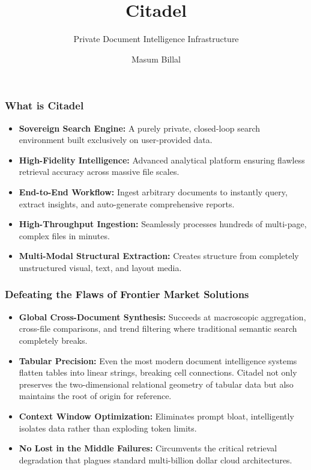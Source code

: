\documentclass{beamer}
\title{Citadel}
\subtitle{Private Document Intelligence Infrastructure}
\author{Masum Billal}
\begin{document}
	\frame{\titlepage}
	
	\begin{frame}
		\frametitle{What is Citadel}
		\begin{itemize}
			\item \textbf{Sovereign Search Engine:} A purely private, closed-loop search environment built exclusively on user-provided data.
			\item \textbf{High-Fidelity Intelligence:} Advanced analytical platform ensuring flawless retrieval accuracy across massive file scales.
			\item \textbf{End-to-End Workflow:} Ingest arbitrary documents to instantly query, extract insights, and auto-generate comprehensive reports.
			\item \textbf{High-Throughput Ingestion:} Seamlessly processes hundreds of multi-page, complex files in minutes.
			\item \textbf{Multi-Modal Structural Extraction:} Creates structure from completely unstructured visual, text, and layout media.
		\end{itemize}
	\end{frame}
	
	\begin{frame}
		\frametitle{Defeating the Flaws of Frontier Market Solutions}
		\begin{itemize}
			\item \textbf{Global Cross-Document Synthesis:} Succeeds at macroscopic aggregation, cross-file comparisons, and trend filtering where traditional semantic search completely breaks.
			\item \textbf{Tabular Precision:} Even the most modern document intelligence systems flatten tables into linear strings, breaking cell connections. Citadel not only preserves the two-dimensional relational geometry of tabular data but also maintains the root of origin for reference.
			\item \textbf{Context Window Optimization:} Eliminates prompt bloat, intelligently isolates data rather than exploding token limits.
			\item \textbf{No Lost in the Middle Failures:} Circumvents the critical retrieval degradation that plagues standard multi-billion dollar cloud architectures.
		\end{itemize}
	\end{frame}
	
\end{document}
